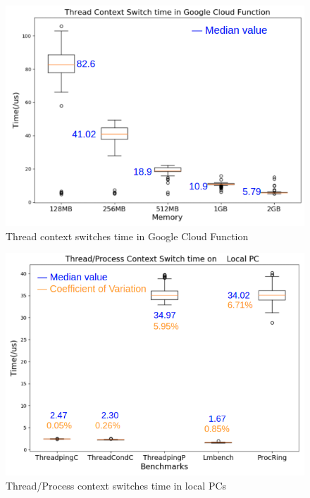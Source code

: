 




\begin{figure}
	\centering
	\includegraphics[width=\linewidth]{figure/thread_cloud.png}
	\caption{Thread context switches time in Google Cloud Function}
	\label{fig:thread_cloud}
\end{figure}

\begin{figure}
	\centering
	\includegraphics[width=\linewidth]{figure/thread_local.png}
	\caption{Thread/Process context switches time in local PCs}
	\label{fig:thread_local}
\end{figure}

